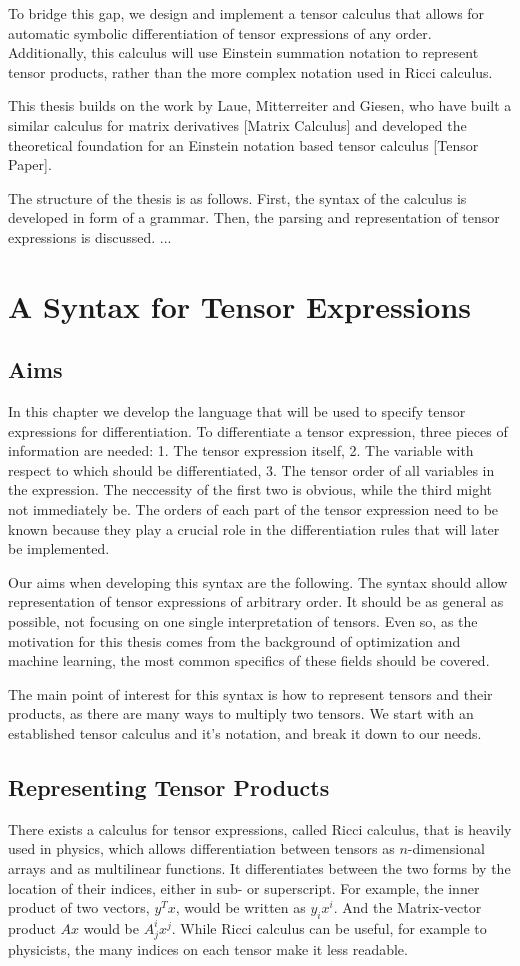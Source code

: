 \documentclass[12pt, a4paper]{report}
\begin{document}
To bridge this gap, we design and implement a tensor calculus that allows for automatic symbolic differentiation of tensor expressions of any order.
Additionally, this calculus will use Einstein summation notation to represent tensor products, rather than the more complex notation used in Ricci calculus.

This thesis builds on the work by Laue, Mitterreiter and Giesen, who have built a similar calculus for matrix derivatives [Matrix Calculus] and developed the theoretical foundation for an Einstein notation based tensor calculus [Tensor Paper].

The structure of the thesis is as follows.
First, the syntax of the calculus is developed in form of a grammar.
Then, the parsing and representation of tensor expressions is discussed.
...

\chapter{A Syntax for Tensor Expressions}
\section{Aims}
In this chapter we develop the language that will be used to specify tensor expressions for differentiation.
To differentiate a tensor expression, three pieces of information are needed: 1. The tensor expression itself, 2. The variable with respect to which should be differentiated, 3. The tensor order of all variables in the expression.
The neccessity of the first two is obvious, while the third might not immediately be.
The orders of each part of the tensor expression need to be known because they play a crucial role in the differentiation rules that will later be implemented.

Our aims when developing this syntax are the following.
The syntax should allow representation of tensor expressions of arbitrary order.
It should be as general as possible, not focusing on one single interpretation of tensors.
Even so, as the motivation for this thesis comes from the background of optimization and machine learning, the most common specifics of these fields should be covered.

The main point of interest for this syntax is how to represent tensors and their products, as there are many ways to multiply two tensors.
We start with an established tensor calculus and it's notation, and break it down to our needs.

\section{Representing Tensor Products}
There exists a calculus for tensor expressions, called Ricci calculus, that is heavily used in physics, which allows differentiation between tensors as $n$-dimensional arrays and as multilinear functions.
It differentiates between the two forms by the location of their indices, either in sub- or superscript.
For example, the inner product of two vectors, $y^Tx$, would be written as $y_ix^i$. And the Matrix-vector product $Ax$ would be $A^i_jx^j$.
While Ricci calculus can be useful, for example to physicists, the many indices on each tensor make it less readable.
\end{document}
